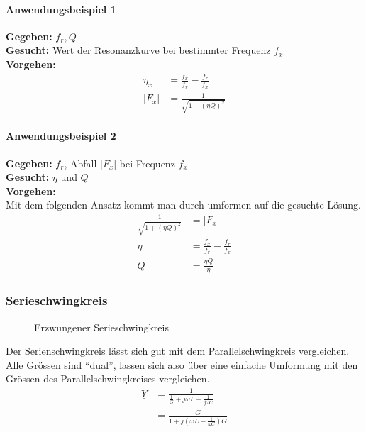 \paragraph{Anwendungsbeispiel 1}
\textbf{Gegeben:} $f_r, Q$\\
\textbf{Gesucht:} Wert der Resonanzkurve bei bestimmter Frequenz $f_x$\\
\textbf{Vorgehen:}
\begin{align}
	\eta_x &= \frac{f_x}{f_r}-\frac{f_r}{f_x}\nonumber\\
	\left| F_x \right| &= \frac{1}{\sqrt{1+(\eta Q)^2}}\nonumber
\end{align}
\paragraph{Anwendungsbeispiel 2}
\textbf{Gegeben:} $f_r$, Abfall $\left|F_x\right|$ bei Frequenz $f_x$\\
\textbf{Gesucht:} $\eta$ und $Q$\\
\textbf{Vorgehen:} \\
Mit dem folgenden Ansatz kommt man durch umformen auf die gesuchte Lösung. 
\begin{align}
	\frac{1}{\sqrt{1+(\eta Q)^2}} &= \left| F_x \right|\nonumber\\
	\eta &= \frac{f_x}{f_r}-\frac{f_r}{f_x}\nonumber\\
	Q &= \frac{\eta Q}{\eta}\nonumber
\end{align}

\subsubsection{Serieschwingkreis}
\begin{wrapfigure}{l}{0.55\textwidth}
\centering
	
	\vspace{-0.15cm}
	\caption{Erzwungener Serieschwingkreis}
	\vspace{-1.0cm}
	\label{fig:SerieSKErzwungen}
\end{wrapfigure}

Der Serienschwingkreis lässt sich gut mit dem Parallelschwingkreis vergleichen.
Alle Grössen sind "`dual"', lassen sich also über eine einfache Umformung mit
den Grössen des Parallelschwingkreises vergleichen.
\begin{align}
  \underline{Y} &= \frac{1}{\frac{1}{G}+j\omega L+\frac{1}{j\omega C}} \nonumber
  \\
  &= \frac{G}{1+j(\omega L-\frac{1}{\omega C})G} \nonumber
\end{align}

